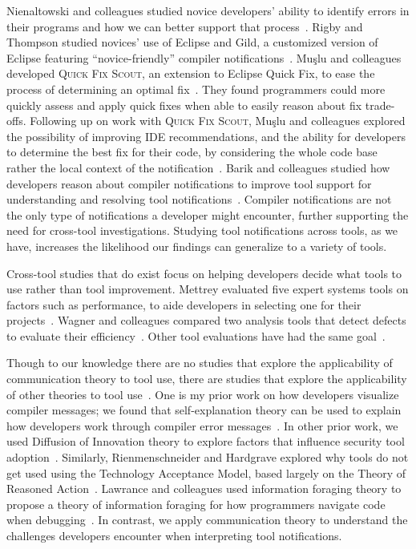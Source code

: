 Nienaltowski and colleagues studied novice developers' ability to identify errors in their programs and how we can better support that process~\cite{Nienaltowski:2008:Compiler}.
Rigby and Thompson studied novices' use of Eclipse and Gild, a customized version of Eclipse featuring ``novice-friendly'' compiler notifications~\cite{Rigby:2005:Novice}.
Mu\c{s}lu and colleagues developed \textsc{Quick Fix Scout}, an extension to Eclipse Quick Fix, to ease the process of determining an
optimal fix~\cite{Mucslu:2012:Speculative}. They found programmers could more quickly assess and apply quick fixes when able to easily reason about fix trade-offs.
Following up on work with \textsc{Quick Fix Scout}, Mu\c{s}lu and colleagues explored the possibility of improving IDE recommendations, and the ability for developers to determine the best fix for their code, by considering the whole code base rather the local context of the notification~\cite{mucslu2012improving}.
Barik and colleagues studied how developers reason about compiler notifications to improve tool support for understanding and resolving tool notifications~\cite{barik14}.
Compiler notifications are not the only type of notifications a developer might encounter, further supporting the need for cross-tool investigations.
Studying tool notifications across tools, as we have, increases the likelihood our findings can generalize to a variety of tools.

Cross-tool studies that do exist focus on helping developers decide what tools to use rather than tool improvement.
Mettrey evaluated five expert systems tools on factors such as performance, to aide developers in selecting one for their projects~\cite{mettrey1991comparative}.
Wagner and colleagues compared two analysis tools that detect defects to evaluate their efficiency~\cite{wagner2008evaluation}.
Other tool evaluations have had the same goal~\cite{roy2009comparison,zheng2006value}.

Though to our knowledge there are no studies that explore the applicability of communication theory to tool use, there are studies that explore the applicability of other theories to tool use~\cite{barik14,xiao2014social,riemenschneider2001explaining}.  
One is my prior work on how developers visualize compiler messages; we found that self-explanation theory can be used to explain how developers work through compiler error messages~\cite{barik14}. 
In other prior work, we used Diffusion of Innovation theory to explore factors that influence 
security tool adoption~\cite{xiao2014social}. 
Similarly, Rienmenschneider and Hardgrave explored why tools do not get used using the Technology Acceptance Model, based largely on the Theory of Reasoned Action~\cite{riemenschneider2001explaining}.
Lawrance and colleagues used information foraging theory to propose a theory of information foraging for how programmers navigate code when debugging~\cite{lawrance2013programmers}. 
In contrast, we apply communication theory to understand the challenges 
developers encounter when interpreting tool notifications.

